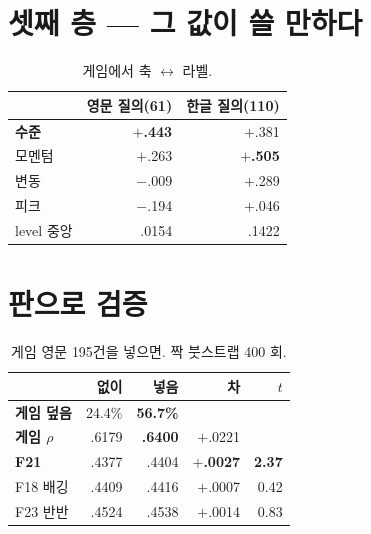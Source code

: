 \documentclass[10pt]{article}
\begin{document}
\section{셋째 층 --- 그 값이 쓸 만하다}

\begin{table}[t]
\centering\tsize
\caption{게임에서 축 $\leftrightarrow$ 라벨.}
\begin{tabular}{lrr}
\toprule
& 영문 질의(61) & 한글 질의(110) \\
\midrule
\textbf{수준} & \textbf{$+$.443} & $+$.381 \\
모멘텀 & $+$.263 & \textbf{$+$.505} \\
변동 & $-$.009 & $+$.289 \\
피크 & $-$.194 & $+$.046 \\
\midrule
level 중앙 & .0154 & .1422 \\
\bottomrule
\end{tabular}
\end{table}



\section{판으로 검증}

\begin{table}[t]
\centering\tsize
\caption{게임 영문 195건을 넣으면. 짝 붓스트랩 400 회.}
\begin{tabular}{lrrrr}
\toprule
& 없이 & 넣음 & 차 & $t$ \\
\midrule
\textbf{게임 덮음} & 24.4\% & \textbf{56.7\%} & & \\
\textbf{게임 $\rho$} & .6179 & \textbf{.6400} & $+$.0221 & \\
\midrule
\textbf{F21} & .4377 & .4404 & \textbf{$+$.0027} & \textbf{2.37} \\
F18 배깅 & .4409 & .4416 & $+$.0007 & 0.42 \\
F23 반반 & .4524 & .4538 & $+$.0014 & 0.83 \\
\bottomrule
\end{tabular}
\end{table}
\end{document}
